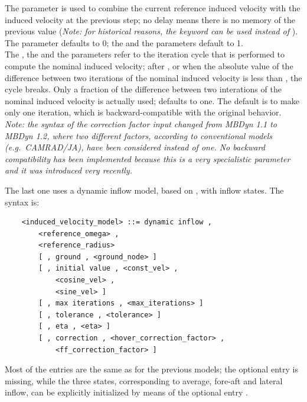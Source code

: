The  parameter is used to
combine the current reference induced velocity with the induced velocity
at the previous step; no delay means there is no memory of the previous value 
(\emph{Note: for historical reasons, the keyword 
can be used instead of }). \\
The  parameter defaults to 0; 
the  
and the  parameters default to 1. \\
The , the  
and the  parameters refer to the iteration cycle 
that is performed to compute the nominal induced velocity; 
after , or when the absolute value 
of the difference between two iterations of the nominal induced 
velocity is less than , the cycle breaks.
Only a fraction  of the difference between two
interations of the nominal induced velocity is actually
used;  defaults to one.
The default is to make only one iteration, which is backward-compatible
with the original behavior.
\emph{
	Note: the syntax of the correction factor input changed
	from MBDyn 1.1 to MBDyn 1.2, where two different factors,
	according to conventional models (e.g.\ CAMRAD/JA), have
	been considered instead of one.
	No backward compatibility has been implemented because 
	this is a very specialistic parameter and it was introduced 
	very recently.
}

\noindent
The last one uses a dynamic inflow model, based on \cite{PITT},
with inflow states.
The syntax is:
\begin{verbatim}
    <induced_velocity_model> ::= dynamic inflow , 
        <reference_omega> , 
        <reference_radius> 
        [ , ground , <ground_node> ]
        [ , initial value , <const_vel> ,
            <cosine_vel> ,
            <sine_vel> ]
        [ , max iterations , <max_iterations> ]
        [ , tolerance , <tolerance> ]
        [ , eta , <eta> ]
        [ , correction , <hover_correction_factor> ,
            <ff_correction_factor> ]
\end{verbatim}
Most of the entries are the same as for the previous models;
the  optional entry is missing, while the three states, 
corresponding to average, fore-aft and lateral inflow,
can be explicitly initialized by means of the optional 
entry .



